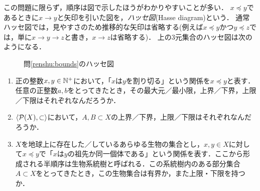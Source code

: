 \documentclass[dvipdfmx,11pt,a4paper]{jsarticle}
\begin{document}
この問題に限らず，順序は図で示したほうがわかりやすいことが多い．
$x \preceq y$であるときに$x \to y$と矢印を引いた図を，\emph{ハッセ図}(Hasse diagram)という．
通常ハッセ図では，見やすさのため推移的な矢印は省略する(例えば$x \preceq y$かつ$y \preceq z$では，単に$x \to y \to z$と書き，$x \to z$は省略する)．
上の3元集合のハッセ図は次のようになる．
\begin{figure}[h]
\centering
{}
\caption{問\ref{renshu:bounds}のハッセ図}
\label{fig:hasse} 
\end{figure}

\begin{renshu}{}{}
\begin{enumerate}
  \item 正の整数$x, y \in \mathbb{N}^+$において，「$x$は$y$を割り切る」という関係を$x \preceq y$と表す．
  任意の正整数$a,b$をとってきたとき，その最大元／最小限，上界／下界，上限／下限はそれぞれなんだろうか．
  \item $\langle \mathcal{P}(X), \subset \rangle$において，$A, B \subset X$の上界／下界，上限／下限はそれぞれなんだろうか．
  \item $X$を地球上に存在した／しているあらゆる生物の集合とし，$x, y \in X$に対して$x \preceq y$で「$x$は$y$の祖先か同一個体である」という関係を表す．ここから形成される半順序は生物系統樹と呼ばれる．この系統樹内のある部分集合$A \subset X$をとってきたとき，この生物集合は有界か，また上限・下限を持つか．
\end{enumerate}
\end{renshu}


\end{document}
